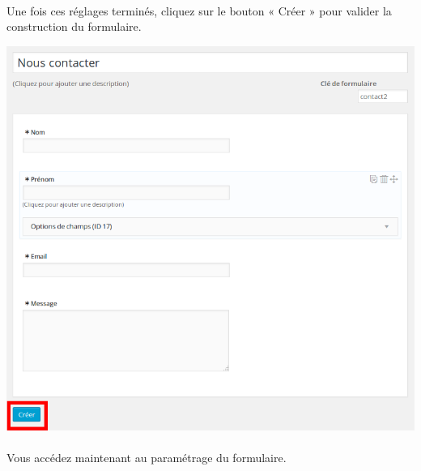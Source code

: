 \documentclass[10pt,a4paper]{article}
\begin{document}
\paragraph{}Une fois ces réglages terminés, cliquez sur le bouton « Créer » pour valider la construction du formulaire.
\begin{center}
\includegraphics[scale=0.3]{img/0186.png}
\end{center}
\paragraph{}Vous accédez maintenant au paramétrage du formulaire.
\end{document}
